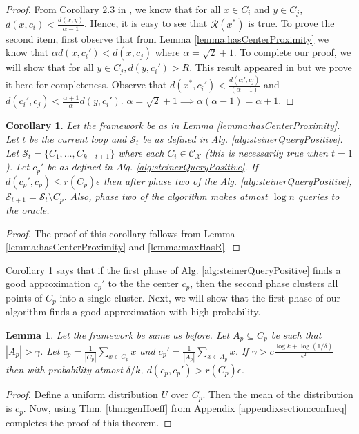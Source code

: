 \documentclass[11pt]{article}
\newtheorem{lemma}[theorem]{Lemma}
\newtheorem{corollary}[theorem]{Corollary}
\newcommand{\mc}{\mathcal}
\begin{document}
\begin{proof}
From Corollary $2.3$ in \cite{awasthi2012center}, we know that for all $x \in C_i$ and $y \in C_j$, $d(x, c_i) < \frac{d(x, y)}{\alpha-1}$. Hence, it is easy to see that $\mc R(x^*)$ is true. To prove the second item, first observe that from Lemma \ref{lemma:hasCenterProximity} we know that $\alpha d(x, c_i') < d(x, c_j)$ where $\alpha = \sqrt{2}+1$. To complete our proof, we will show that for all $y \in C_j, d(y, c_i') > R$. This result appeared in \cite{balcan2012clustering} but we prove it here for completeness. Observe that $d(x^*, c_i') < \frac{d(c_i', c_j)}{(\alpha-1)}$ and $d(c_i' , c_j) < \frac{\alpha+1}{\alpha}d(y, c_i')$. $\alpha = \sqrt{2}+1 \implies \alpha(\alpha-1) = \alpha+1$.
\end{proof}

\begin{corollary}
\label{cor:phase2}
Let the framework be as in Lemma \ref{lemma:hasCenterProximity}. Let $t$ be the current loop and $\mc S_t$ be as defined in Alg. \ref{alg:steinerQueryPositive}. Let $\mc S_t = \{C_{1}, \ldots, C_{k-t+1}\}$ where each $C_{i} \in \mc C_{\mc X}$ (this is necessarily true when $t = 1$). Let $c_p'$ be as defined in Alg. \ref{alg:steinerQueryPositive}. If $d(c_p', c_p) \le r(C_p)\epsilon$ then after phase two of the Alg. \ref{alg:steinerQueryPositive}, $\mc S_{t+1} = \mc S_t\setminus C_p$. Also, phase two of the algorithm makes atmost $\log n$ queries to the oracle.
\end{corollary}
\begin{proof}
The proof of this corollary follows from Lemma \ref{lemma:hasCenterProximity} and \ref{lemma:maxHasR}. 
\end{proof}

\noindent Corollary \ref{cor:phase2} says that if the first phase of Alg. \ref{alg:steinerQueryPositive} finds a good approximation $c_p'$ to the the center $c_p$, then the second phase clusters all points of $C_p$ into a single cluster. Next, we will show that the first phase of our algorithm finds a good approximation with high probability.

\begin{lemma}
\label{lemma:phase1}
Let the framework be same as before. Let $A_p \subseteq C_p$ be such that $|A_p| > \gamma$. Let $c_p = \frac{1}{|C_p|}\sum_{x \in C_p} x$ and $c_p' = \frac{1}{|A_p|}\sum_{x \in A_p} x$. If $\gamma > c\frac{\log k + \log(1/\delta)}{\epsilon^2}$ then with probability atmost $\delta/k$, $d(c_p, c_p') > r(C_p)\epsilon$.
\end{lemma}
\begin{proof}
Define a uniform distribution $U$ over $C_p$. Then the mean of the distribution is $c_p$. Now, using Thm. \ref{thm:genHoeff} from Appendix \ref{appendixsection:conIneq} completes the proof of this theorem.
\end{proof}
\end{document}
